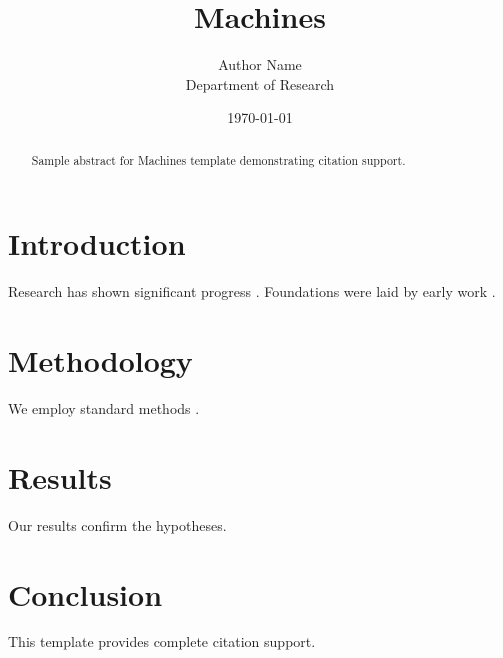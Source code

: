 \documentclass{mdpi}
\title{Machines}
\author{Author Name \\ \small Department of Research}
\date{\today}
\begin{document}
\maketitle

\begin{abstract}
Sample abstract for Machines template demonstrating citation support.
\end{abstract}

\section{Introduction}
Research has shown significant progress \citep{einstein1905}. Foundations were laid by early work \citep{turing1950}.

\section{Methodology}
We employ standard methods \citep{knuth1984}.

\section{Results}
Our results confirm the hypotheses.

\section{Conclusion}
This template provides complete citation support.



\end{document}
